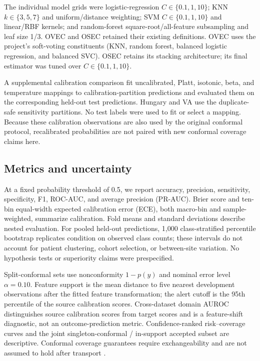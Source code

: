 \documentclass[conference]{IEEEtran}
\begin{document}
The individual model grids were logistic-regression $C\in\{0.1,1,10\}$; KNN $k\in\{3,5,7\}$ and uniform/distance weighting; SVM $C\in\{0.1,1,10\}$ and linear/RBF kernels; and random-forest square-root/all-feature subsampling and leaf size 1/3. OVEC and OSEC retained their existing definitions. OVEC uses the project’s soft-voting constituents (KNN, random forest, balanced logistic regression, and balanced SVC). OSEC retains its stacking architecture; its final estimator was tuned over $C\in\{0.1,1,10\}$.

A supplemental calibration comparison fit uncalibrated, Platt, isotonic, beta, and temperature mappings to calibration-partition predictions and evaluated them on the corresponding held-out test predictions. Hungary and VA use the duplicate-safe sensitivity partitions. No test labels were used to fit or select a mapping. Because these calibration observations are also used by the original conformal protocol, recalibrated probabilities are not paired with new conformal coverage claims here.

\subsection{Metrics and uncertainty}
At a fixed probability threshold of 0.5, we report accuracy, precision, sensitivity, specificity, F1, ROC-AUC, and average precision (PR-AUC). Brier score and ten-bin equal-width expected calibration error (ECE), both macro-bin and sample-weighted, summarize calibration. Fold means and standard deviations describe nested evaluation. For pooled held-out predictions, 1,000 class-stratified percentile bootstrap replicates condition on observed class counts; these intervals do not account for patient clustering, cohort selection, or between-site variation. No hypothesis tests or superiority claims were prespecified.

Split-conformal sets use nonconformity $1-p(y)$ and nominal error level $\alpha=0.10$. Feature support is the mean distance to five nearest development observations after the fitted feature transformation; the alert cutoff is the 95th percentile of the source calibration scores. Cross-dataset domain AUROC distinguishes source calibration scores from target scores and is a feature-shift diagnostic, not an outcome-prediction metric. Confidence-ranked risk--coverage curves and the joint singleton-conformal / in-support accepted subset are descriptive. Conformal coverage guarantees require exchangeability and are not assumed to hold after transport \cite{angelopoulos2023conformal}.
\end{document}

